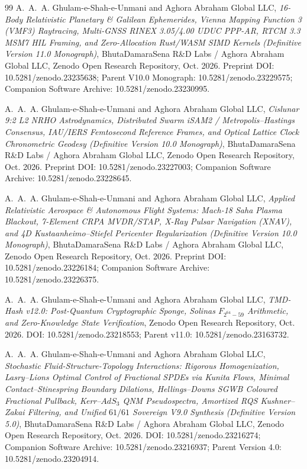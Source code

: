 \documentclass[11pt,a4paper,reqno]{article}
\def\texttt#1{#1}%
\def\mathrm#1{#1}%
\def\mathbb#1{#1}%
\def\zenodo#1{10.5281/zenodo.#1}%
\newcommand{\zenodo}[1]{\href{https://doi.org/10.5281/zenodo.#1}{\texttt{10.5281/\allowbreak zenodo.#1}}}
\theoremstyle{plain}
\theoremstyle{definition}
\theoremstyle{remark}
\numberwithin{equation}{section}
\begin{document}
\begin{thebibliography}{99}
A.~A.~A. Ghulam-e-Shah-e-Unmani and {Aghora Abraham Global LLC},
\emph{16-Body Relativistic Planetary \& Galilean Ephemerides, Vienna Mapping Function 3 (VMF3) Raytracing, Multi-GNSS RINEX 3.05/4.00 UDUC PPP-AR, RTCM 3.3 MSM7 HIL Framing, and Zero-Allocation Rust/WASM SIMD Kernels (Definitive Version 11.0 Monograph)},
BhutaDamaraSena R\&D Labs / Aghora Abraham Global LLC, Zenodo Open Research Repository, Oct. 2026.
\texttt{Preprint DOI:} \zenodo{23235638}; Parent V10.0 Monograph: \zenodo{23229575}; Companion Software Archive: \zenodo{23230995}.

A.~A.~A. Ghulam-e-Shah-e-Unmani and {Aghora Abraham Global LLC},
\emph{Cislunar 9:2 L2 NRHO Astrodynamics, Distributed Swarm iSAM2 / Metropolis--Hastings Consensus, IAU/IERS Femtosecond Reference Frames, and Optical Lattice Clock Chronometric Geodesy (Definitive Version 10.0 Monograph)},
BhutaDamaraSena R\&D Labs / Aghora Abraham Global LLC, Zenodo Open Research Repository, Oct. 2026.
\texttt{Preprint DOI:} \zenodo{23227003}; Companion Software Archive: \zenodo{23228645}.

A.~A.~A. Ghulam-e-Shah-e-Unmani and {Aghora Abraham Global LLC},
\emph{Applied Relativistic Aerospace \& Autonomous Flight Systems: Mach-18 Saha Plasma Blackout, 7-Element CRPA MVDR/STAP, X-Ray Pulsar Navigation (XNAV), and 4D Kustaanheimo--Stiefel Pericenter Regularization (Definitive Version 10.0 Monograph)},
BhutaDamaraSena R\&D Labs / Aghora Abraham Global LLC, Zenodo Open Research Repository, Oct. 2026.
\texttt{Preprint DOI:} \zenodo{23226184}; Companion Software Archive: \zenodo{23226375}.

A.~A.~A. Ghulam-e-Shah-e-Unmani and {Aghora Abraham Global LLC},
\emph{TMD-Hash v12.0: Post-Quantum Cryptographic Sponge, Solinas $\mathbb{F}_{2^{64}-59}$ Arithmetic, and Zero-Knowledge State Verification},
Zenodo Open Research Repository, Oct. 2026.
\texttt{DOI:} \zenodo{23218553}; Parent v11.0: \zenodo{23163732}.

A.~A.~A. Ghulam-e-Shah-e-Unmani and {Aghora Abraham Global LLC},
\emph{Stochastic Fluid-Structure-Topology Interactions: Rigorous Homogenization, Lasry--Lions Optimal Control of Fractional SPDEs via Kunita Flows, Minimal Contact--Stinespring Boundary Dilations, Hellings--Downs SGWB Coloured Fractional Pullback, Kerr--$\mathrm{AdS}_3$ QNM Pseudospectra, Amortized RQS Kushner--Zakai Filtering, and Unified $61/61$ Sovereign V9.0 Synthesis (Definitive Version 5.0)},
BhutaDamaraSena R\&D Labs / Aghora Abraham Global LLC, Zenodo Open Research Repository, Oct. 2026.
\texttt{DOI:} \zenodo{23216274}; Companion Software Archive: \zenodo{23216937}; Parent Version 4.0: \zenodo{23204914}.


\end{thebibliography}
\end{document}
